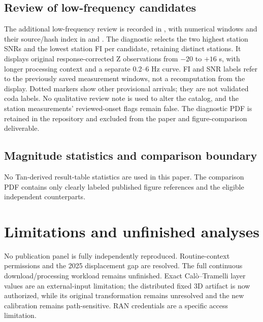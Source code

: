 \subsection*{Review of low-frequency candidates}
The additional low-frequency review is recorded in , with numerical windows and their source/hash index in  and . The diagnostic selects the two highest station SNRs and the lowest station FI per candidate, retaining distinct stations. It displays original response-corrected Z observations from $-20$ to $+16$ s, with longer processing context and a separate 0.2--6 Hz curve. FI and SNR labels refer to the previously saved measurement windows, not a recomputation from the display. Dotted markers show other provisional arrivals; they are not validated coda labels. No qualitative review note is used to alter the catalog, and the station measurements' reviewed-onset flags remain false. The diagnostic PDF is retained in the repository and excluded from the paper and figure-comparison deliverable.

\subsection*{Magnitude statistics and comparison boundary}


No Tan-derived result-table statistics are used in this paper. The comparison PDF contains only clearly labeled published figure references and the eligible independent counterparts.





\section{Limitations and unfinished analyses}
No publication panel is fully independently reproduced.  Routine-context permissions and the 2025 displacement gap are resolved. The full continuous download/processing workload remains unfinished. Exact Cal\`o--Tramelli layer values are an external-input limitation; the distributed fixed 3D artifact is now authorized, while its original transformation remains unresolved and the new calibration remains path-sensitive. RAN credentials are a specific access limitation.

